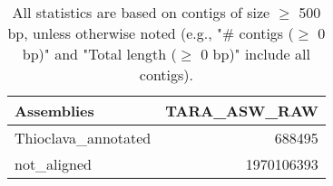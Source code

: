 \documentclass[12pt,a4paper]{article}
\begin{document}
\begin{table}[ht]
\begin{center}
\caption{All statistics are based on contigs of size $\geq$ 500 bp, unless otherwise noted (e.g., "\# contigs ($\geq$ 0 bp)" and "Total length ($\geq$ 0 bp)" include all contigs).}
\begin{tabular}{|l*{1}{|r}|}
\hline
Assemblies & TARA\_ASW\_RAW \\ \hline
Thioclava\_annotated & 688495 \\ \hline
not\_aligned & 1970106393 \\ \hline
\end{tabular}
\end{center}
\end{table}
\end{document}
